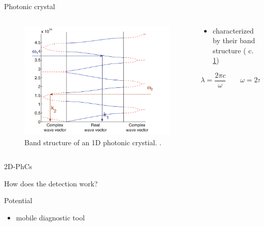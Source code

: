 \begin{frame}{Photonic crystal}

  \begin{columns}

    \begin{column}{0.49\textwidth}
      \begin{figure}
        \centering
        \includegraphics[width=1\textwidth]{./bilder/band_structure.png}
        \caption{Band structure of an 1D photonic crystial. \cite{intro_pho}.}
        \label{fig: band_structure}
      \end{figure}
    \end{column}

    \begin{column}{0.49\textwidth}
    \begin{itemize}
      \setlength\itemsep{1.2em}
      \item{ characterized by their band structure ( c. \ref{fig: band_structure}) }
    \end{itemize}
    \begin{equation*}
      \lambda=\frac{2\pi c}{\omega}\qquad \omega =2\pi f
    \end{equation*}
    \end{column}

  \end{columns}

\end{frame}

\begin{frame}{2D-PhCs}

\end{frame}

\begin{frame}{How does the detection work?}

\end{frame}

\begin{frame}{Potential}
  \begin{itemize}
    \item { mobile diagnostic tool}
  \end{itemize}
\end{frame}

\begin{frame}
  \nocite{*}
  \printbibliography
\end{frame}

